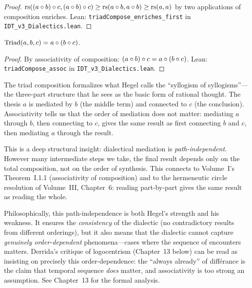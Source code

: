 \begin{proof}
$\mathrm{rs}((a \circ b) \circ c, (a \circ b) \circ c) \geq
\mathrm{rs}(a \circ b, a \circ b) \geq \mathrm{rs}(a, a)$ by two applications of
composition enriches.
Lean: \texttt{triadCompose\_enriches\_first} in
\texttt{IDT\_v3\_Dialectics.lean}.
\end{proof}

\begin{theorem}
\label{thm:triad-assoc}
$\mathrm{Triad}(a, b, c) = a \circ (b \circ c)$.
\end{theorem}

\begin{proof}
By associativity of composition: $(a \circ b) \circ c = a \circ (b \circ c)$.
Lean: \texttt{triadCompose\_assoc} in \texttt{IDT\_v3\_Dialectics.lean}.
\end{proof}

\begin{interpretation}
The triad composition formalizes what Hegel calls the ``syllogism of
syllogisms''---the three-part structure that he sees as the basic form of
rational thought. The thesis $a$ is mediated by $b$ (the middle term)
and connected to $c$ (the conclusion). Associativity tells us that the
order of mediation does not matter: mediating $a$ through $b$, then
connecting to $c$, gives the same result as first connecting $b$ and $c$,
then mediating $a$ through the result.

This is a deep structural insight: dialectical mediation is
\emph{path-independent}. However many intermediate steps we take, the
final result depends only on the total composition, not on the order of
synthesis. This connects to Volume~I's Theorem~I.1.1 (associativity of
composition) and to the hermeneutic circle resolution of Volume~III,
Chapter~6: reading part-by-part gives the same result as reading the whole.

Philosophically, this path-independence is both Hegel's strength and his
weakness. It ensures the \emph{consistency} of the dialectic (no
contradictory results from different orderings), but it also means that the
dialectic cannot capture \emph{genuinely order-dependent} phenomena---cases
where the sequence of encounters matters. Derrida's critique of
logocentrism (Chapter~13 below) can be read as insisting on precisely this
order-dependence: the ``always already'' of diff\'erance is the claim that
temporal sequence \emph{does} matter, and associativity is too strong an
assumption. See Chapter~13 for the formal analysis.
\end{interpretation}


